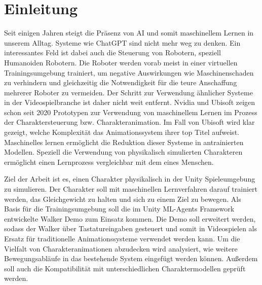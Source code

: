\chapter{Einleitung}
\label{sec:einleitung}
Seit einigen Jahren steigt die Präsenz von AI und somit maschinellem Lernen in unserem Alltag. Systeme wie ChatGPT sind nicht mehr weg zu denken. Ein interessantes Feld ist dabei auch die Steuerung von Robotern, speziell Humanoiden Robotern. Die Roboter werden vorab meist in einer virtuellen Trainingsumgebung trainiert, um negative Auswirkungen wie Maschinenschaden zu verhindern und gleichzeitig die Notwendigkeit für die teure Anschaffung mehrerer Roboter zu vermeiden. Der Schritt zur Verwendung ähnlicher Systeme in der Videospielbranche ist daher nicht weit entfernt. Nvidia und Ubisoft zeigen schon seit 2020 Prototypen zur Verwendung von maschinellem Lernen im Prozess der Charaktersteuerung bzw. Charakteranimation.\cite{2022-TOG-ASE}\cite{10.1145/3355089.3356536} Im Fall von Ubisoft wird klar gezeigt, welche Komplexität das Animationssystem ihrer top Titel aufweist. Maschinelles lernen ermöglicht die Reduktion dieser Systeme in antrainierten Modellen. Speziell die Verwendung von physikalisch simulierten Charakteren ermöglicht einen Lernprozess vergleichbar mit dem eines Menschen.

Ziel der Arbeit ist es, einen Charakter physikalisch in der Unity Spieleumgebung zu simulieren. Der Charakter soll mit maschinellen Lernverfahren darauf trainiert werden, das Gleichgewicht zu halten und sich zu einem Ziel zu bewegen. Als Basis für die Trainingsumgebung soll die im Unity ML-Agents Framework entwickelte Walker Demo zum Einsatz kommen. Die Demo soll erweitert werden, sodass der Walker über Tastatureingaben gesteuert und somit in Videospielen als Ersatz für traditionelle Animationssysteme verwendet werden kann. Um die Vielfalt von Charakteranimationen abzudecken wird analysiert, wie weitere Bewegungsabläufe in das bestehende System eingefügt werden können. Außerdem soll auch die Kompatibilität mit unterschiedlichen Charaktermodellen geprüft werden.

